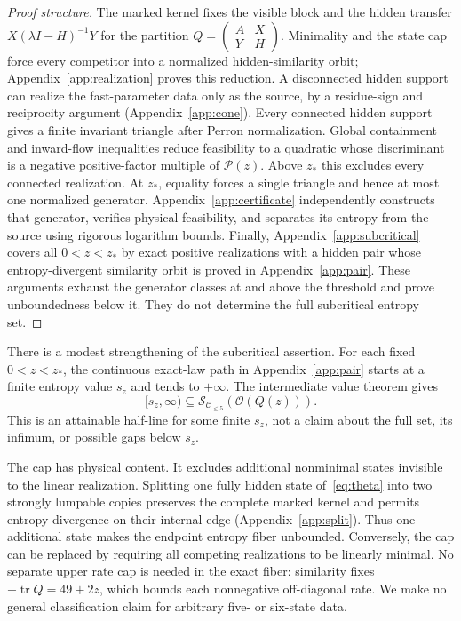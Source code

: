 \documentclass[aps,pre,onecolumn,11pt,longbibliography,notitlepage]{revtex4-2}
\newcommand{\1}{\mathbf 1}
\newcommand{\C}{\mathcal C}
\newcommand{\Obs}{\mathcal O}
\newcommand{\Ent}{\mathcal S}
\newcommand{\tr}{\operatorname{tr}}
\newcommand{\zs}{z_*}
\begin{document}
\begin{proof}[Proof structure]
The marked kernel fixes the visible block and the hidden transfer $X(\lambda I-H)^{-1}Y$ for the partition $Q=\left(\begin{smallmatrix}A&X\\Y&H\end{smallmatrix}\right)$. Minimality and the state cap force every competitor into a normalized hidden-similarity orbit; Appendix~\ref{app:realization} proves this reduction. A disconnected hidden support can realize the fast-parameter data only as the source, by a residue-sign and reciprocity argument (Appendix~\ref{app:cone}). Every connected hidden support gives a finite invariant triangle after Perron normalization. Global containment and inward-flow inequalities reduce feasibility to a quadratic whose discriminant is a negative positive-factor multiple of $\mathcal P(z)$. Above $\zs$ this excludes every connected realization. At $\zs$, equality forces a single triangle and hence at most one normalized generator. Appendix~\ref{app:certificate} independently constructs that generator, verifies physical feasibility, and separates its entropy from the source using rigorous logarithm bounds. Finally, Appendix~\ref{app:subcritical} covers all $0<z<\zs$ by exact positive realizations with a hidden pair whose entropy-divergent similarity orbit is proved in Appendix~\ref{app:pair}. These arguments exhaust the generator classes at and above the threshold and prove unboundedness below it. They do not determine the full subcritical entropy set.
\end{proof}

There is a modest strengthening of the subcritical assertion. For each
fixed $0<z<\zs$, the continuous exact-law path in Appendix~\ref{app:pair}
starts at a finite entropy value $s_z$ and tends to $+\infty$. The
intermediate value theorem gives
\begin{equation}
 [s_z,\infty)\subseteq\Ent_{\C_{\le5}}(\Obs(Q(z))).\label{eq:halfline}
\end{equation}
This is an attainable half-line for some finite $s_z$, not a claim about
the full set, its infimum, or possible gaps below $s_z$.

The cap has physical content. It excludes additional nonminimal states invisible to the linear realization. Splitting one fully hidden state of~\eqref{eq:theta} into two strongly lumpable copies preserves the complete marked kernel and permits entropy divergence on their internal edge (Appendix~\ref{app:split}). Thus one additional state makes the endpoint entropy fiber unbounded. Conversely, the cap can be replaced by requiring all competing realizations to be linearly minimal. No separate upper rate cap is needed in the exact fiber: similarity fixes $-\tr Q=49+2z$, which bounds each nonnegative off-diagonal rate. We make no general classification claim for arbitrary five- or six-state data.
\end{document}
